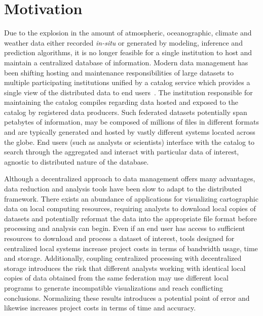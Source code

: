 \section{Motivation}
\label{sec:motivation}
Due to the explosion in the amount of atmospheric, oceanographic,
climate and weather data either recorded \emph{in-situ} or generated
by modeling, inference and prediction algorithms, it is no longer
feasible for a single institution to host and maintain a centralized
database of information. Modern data management has been shifting
hosting and maintenance responsibilities of large datasets to multiple
participating institutions unified by a catalog service which provides
a single view of the distributed data to end users~\cite{luettich13,
  williams09, chervenak00}. The institution responsible for
maintaining the catalog compiles \metadata{} regarding data hosted and
exposed to the catalog by registered data producers. Such federated
datasets potentially span petabytes of information, may be
composed of millions of files in different formats and are typically
generated and hosted by vastly different systems located across the
globe. End users (such as analysts or scientists) interface with the
catalog to search through the aggregated \metadata{} and interact with
particular data of interest, agnostic to distributed nature of the
database.

Although a decentralized approach to data management offers many
advantages, data reduction and analysis tools have been slow to adapt
to the distributed framework. There exists an abundance of
applications for visualizing cartographic data on local computing
resources, requiring analysts to download local copies of datasets
and potentially reformat the data into the appropriate file format
before processing and analysis can begin. Even if an end user has
access to sufficient resources to download and process a dataset of
interest, tools designed for centralized local systems increase
project costs in terms of bandwidth usage, time and
storage. Additionally, coupling centralized processing with
decentralized storage introduces the risk that different analysts
working with identical local copies of data obtained from the same
federation may use different local programs to generate incompatible
visualizations and reach conflicting conclusions. Normalizing these
results introduces a potential point of error and likewise increases
project costs in terms of time and accuracy.

